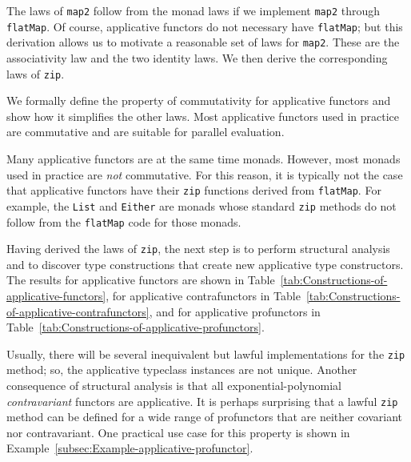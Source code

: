 The laws of \lstinline!map2! follow from the monad laws if we implement
\lstinline!map2! through \lstinline!flatMap!. Of course, applicative
functors do not necessary have \lstinline!flatMap!; but this derivation
allows us to motivate a reasonable set of laws for \lstinline!map2!.
These are the associativity law and the two identity laws. We then
derive the corresponding laws of \lstinline!zip!.

We formally define the property of commutativity for applicative functors
and show how it simplifies the other laws. Most applicative functors
used in practice are commutative and are suitable for parallel evaluation.

Many applicative functors are at the same time monads. However, most
monads used in practice are \emph{not} commutative. For this reason,
it is typically not the case that applicative functors have their
\lstinline!zip! functions derived from \lstinline!flatMap!. For
example, the \lstinline!List! and \lstinline!Either! are monads
whose standard \lstinline!zip! methods do not follow from the \lstinline!flatMap!
code for those monads.

Having derived the laws of \lstinline!zip!, the next step is to perform
structural analysis and to discover type constructions that create
new applicative type constructors. The results for applicative functors
are shown in Table~\ref{tab:Constructions-of-applicative-functors},
for applicative contrafunctors in Table~\ref{tab:Constructions-of-applicative-contrafunctors},
and for applicative profunctors in Table~\ref{tab:Constructions-of-applicative-profunctors}. 

Usually, there will be several inequivalent but lawful implementations
for the \lstinline!zip! method; so, the applicative typeclass instances
are not unique. Another consequence of structural analysis is that
all exponential-polynomial \emph{contravariant} functors are applicative.
It is perhaps surprising that a lawful \lstinline!zip! method can
be defined for a wide range of profunctors that are neither covariant
nor contravariant. One practical use case for this property is shown
in Example~\ref{subsec:Example-applicative-profunctor}.


